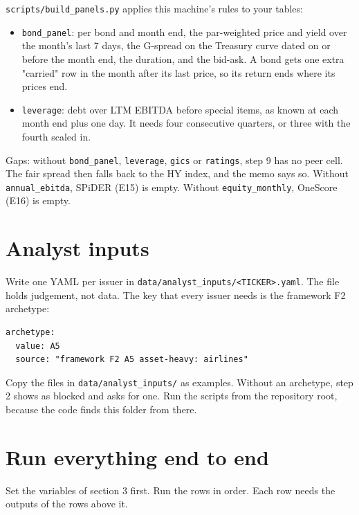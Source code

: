 \documentclass[10.5pt,a4paper]{article}
\newcommand{\code}[1]{\texttt{\small #1}}
\begin{document}
\code{scripts/\allowbreak{}build\_\allowbreak{}panels.py} applies this machine's rules to your tables:

\begin{itemize}
\item \code{bond\_\allowbreak{}panel}: per bond and month end, the par-weighted price and yield over the month's last 7 days, the G-spread on the Treasury curve dated on or before the month end, the duration, and the bid-ask. A bond gets one extra "carried" row in the month after its last price, so its return ends where its prices end.
\item \code{leverage}: debt over LTM EBITDA before special items, as known at each month end plus one day. It needs four consecutive quarters, or three with the fourth scaled in.
\end{itemize}

Gaps: without \code{bond\_\allowbreak{}panel}, \code{leverage}, \code{gics} or \code{ratings}, step 9 has no peer cell. The fair spread then falls back to the HY index, and the memo says so. Without \code{annual\_\allowbreak{}ebitda}, SPiDER (E15) is empty. Without \code{equity\_\allowbreak{}monthly}, OneScore (E16) is empty.

\section{Analyst inputs}

Write one YAML per issuer in \code{data/\allowbreak{}analyst\_\allowbreak{}inputs/\allowbreak{}<TICKER>.yaml}. The file holds judgement, not data. The key that every issuer needs is the framework F2 archetype:

\begin{lstlisting}
archetype:
  value: A5
  source: "framework F2 A5 asset-heavy: airlines"
\end{lstlisting}

Copy the files in \code{data/\allowbreak{}analyst\_\allowbreak{}inputs/\allowbreak{}} as examples. Without an archetype, step 2 shows as blocked and asks for one. Run the scripts from the repository root, because the code finds this folder from there.

\section{Run everything end to end}

Set the variables of section 3 first. Run the rows in order. Each row needs the outputs of the rows above it.
\end{document}
